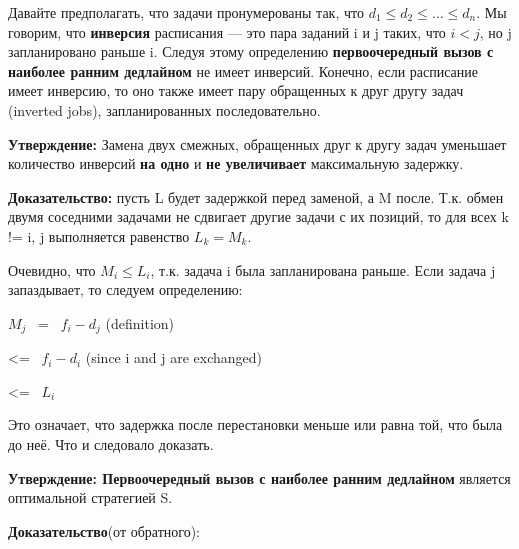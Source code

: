 \vspace{\baselineskip}
Давайте предполагать, что задачи пронумерованы так, что $d_1 \le d_2 \le \ldots \le d_n$. Мы говорим, что \textbf{инверсия} расписания --- это пара заданий i и j таких, что $i < j$, но j запланировано раньше i. Следуя этому определению \textbf{первоочередный вызов с наиболее ранним дедлайном} не имеет инверсий. Конечно, если расписание имеет инверсию, то оно также имеет пару обращенных к друг другу задач (inverted jobs), запланированных последовательно.

\vspace{\baselineskip}
\textbf{Утверждение:} Замена двух смежных, обращенных друг к другу задач уменьшает количество инверсий \textbf{на одно} и \textbf{не увеличивает} максимальную задержку.

\vspace{\baselineskip}
\textbf{Доказательство:} пусть L будет задержкой перед заменой, а M после. Т.к. обмен двумя соседними задачами не сдвигает другие задачи с их позиций, то для всех k != i, j выполняется равенство $L_k = M_k$.

\vspace{\baselineskip}
Очевидно, что $M_i \le L_i$, т.к. задача i была запланирована раньше. Если задача j запаздывает, то следуем определению: 

\vspace{\baselineskip}
\begin{tcolorbox}

\hspace{5cm} $M_j$ \ = \ $f_i - d_j$ (definition)

\hspace{5cm} \hspace{4mm} <= \ $f_i - d_i$ (since i and j are exchanged)
 
\hspace{5cm} \hspace{4mm} <= \ $L_i$    
\end{tcolorbox}

\vspace{\baselineskip}
Это означает, что задержка после перестановки меньше или равна той, что была до неё. Что и следовало доказать.

\vspace{\baselineskip}
\textbf{Утверждение: Первоочередный вызов с наиболее ранним дедлайном} является оптимальной стратегией S.

\vspace{\baselineskip}
\textbf{Доказательство}(от обратного): 

